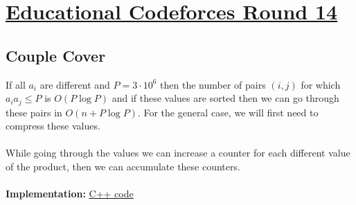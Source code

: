 \documentclass[a4paper,12pt]{article}
\begin{document}
\section{\href{http://codeforces.com/contest/691}{Educational Codeforces Round 14}}

\subsection{Couple Cover}

If all $a_i$ are different and $P = 3 \cdot 10^6$ then the number of pairs $(i,j)$ for which $a_i a_j \leq P$ is $O(P\log P)$ and if these values are sorted then we can go through these pairs in $O(n + P\log P)$. For the general case, we will first need to compress these values.
\\ \\
While going through the values we can increase a counter for each different value of the product, then we can accumulate these counters.
\\ \\
\textbf{Implementation:} \href{http://codeforces.com/contest/691/submission/19352079}{C++ code}
\end{document}
